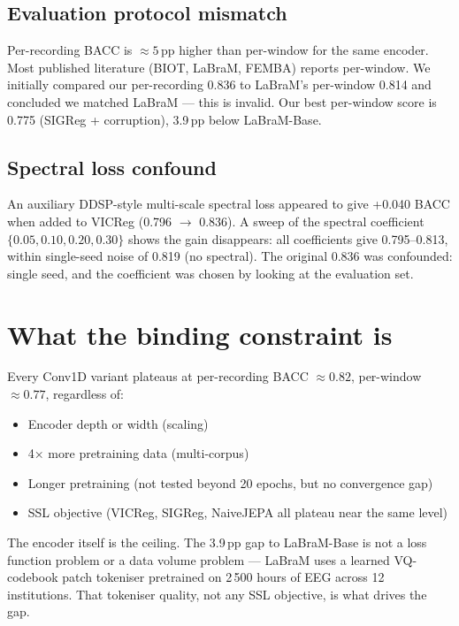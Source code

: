 \documentclass[11pt,a4paper]{article}
\begin{document}
\subsection*{Evaluation protocol mismatch}
Per-recording BACC is $\approx5$\,pp higher than per-window for the same encoder.
Most published literature (BIOT, LaBraM, FEMBA) reports per-window.
We initially compared our per-recording 0.836 to LaBraM's per-window 0.814 and
concluded we matched LaBraM — this is invalid.
Our best per-window score is 0.775 (SIGReg + corruption), 3.9\,pp below LaBraM-Base.

\subsection*{Spectral loss confound}
An auxiliary DDSP-style multi-scale spectral loss appeared to give +0.040 BACC
when added to VICReg (0.796 $\to$ 0.836).  A sweep of the spectral coefficient
$\{0.05, 0.10, 0.20, 0.30\}$ shows the gain disappears:
all coefficients give 0.795--0.813, within single-seed noise of 0.819 (no spectral).
The original 0.836 was confounded: single seed, and the coefficient was chosen
by looking at the evaluation set.

\bigskip

\section{What the binding constraint is}

Every Conv1D variant plateaus at per-recording BACC $\approx 0.82$,
per-window $\approx 0.77$, regardless of:
\begin{itemize}[noitemsep]
  \item Encoder depth or width (scaling)
  \item 4× more pretraining data (multi-corpus)
  \item Longer pretraining (not tested beyond 20 epochs, but no convergence gap)
  \item SSL objective (VICReg, SIGReg, NaiveJEPA all plateau near the same level)
\end{itemize}

The encoder itself is the ceiling.  The 3.9\,pp gap to LaBraM-Base is not a loss
function problem or a data volume problem — LaBraM uses a learned VQ-codebook
patch tokeniser pretrained on 2\,500 hours of EEG across 12 institutions.
That tokeniser quality, not any SSL objective, is what drives the gap.
\end{document}
